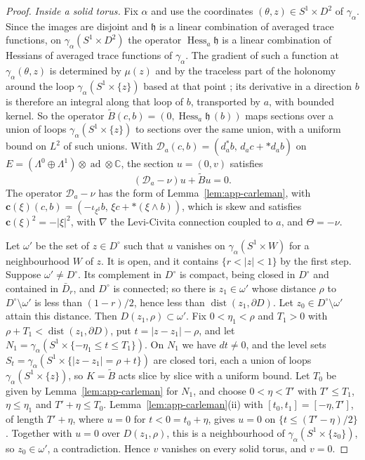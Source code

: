 \documentclass[11pt]{amsart}
\theoremstyle{definition}
\theoremstyle{remark}
\theoremstyle{plain}
\numberwithin{equation}{section}
\newcommand{\CC}{\mathbb{C}}
\newcommand{\ad}{\operatorname{ad}}
\newcommand{\dist}{\operatorname{dist}}
\begin{document}
\begin{proof}
\emph{Inside a solid torus.} Fix $\alpha$ and use the coordinates $(\theta,z)\in S^1\times D^2$ of
$\gamma_\alpha$. Since the images are disjoint and $\mathfrak h$ is a linear combination of averaged
trace functions, on $\gamma_\alpha(S^1\times D^2)$ the operator $\operatorname{Hess}_a\mathfrak h$ is a
linear combination of Hessians of averaged trace functions of $\gamma_\alpha$. The gradient of such
a function at $\gamma_\alpha(\theta,z)$ is determined by $\mu(z)$ and by the traceless part of the
holonomy around the loop $\gamma_\alpha(S^1\times\{z\})$ based at that point
\cite[Lemma~5.12]{Donaldson-book}; its derivative in a direction $b$ is therefore an integral
along that loop of $b$, transported by $a$, with bounded kernel. So the operator
$\widetilde B(c,b)=(0,\operatorname{Hess}_a\mathfrak h\,(b))$ maps sections over a union of loops
$\gamma_\alpha(S^1\times\{z\})$ to sections over the same union, with a uniform bound on $L^2$ of
such unions. With $\mathcal D_a(c,b)=(d_a^*b,\,d_ac+*d_ab)$ on
$E=(\Lambda^0\oplus\Lambda^1)\otimes\ad\otimes\CC$, the section $u=(0,v)$ satisfies
\[
(\mathcal D_a-\nu)u+\widetilde Bu=0 .
\]
The operator $\mathcal D_a-\nu$ has the form of Lemma~\ref{lem:app-carleman}, with
$\mathbf c(\xi)(c,b)=(-\iota_{\xi^\sharp}b,\,\xi c+*(\xi\wedge b))$, which is skew and satisfies
$\mathbf c(\xi)^2=-|\xi|^2$, with $\nabla$ the Levi-Civita connection coupled to $a$, and
$\Theta=-\nu$.

Let $\omega'$ be the set of $z\in D^\circ$ such that $u$ vanishes on $\gamma_\alpha(S^1\times W)$
for a neighbourhood $W$ of $z$. It is open, and it contains $\{r<|z|<1\}$ by the first step.
Suppose $\omega'\ne D^\circ$. Its complement in $D^\circ$ is compact, being closed in $D^\circ$ and
contained in $\bar D_r$, and $D^\circ$ is connected; so there is $z_1\in\omega'$ whose distance
$\rho$ to $D^\circ\setminus\omega'$ is less than $(1-r)/2$, hence less than
$\dist(z_1,\partial D)$. Let $z_0\in D^\circ\setminus\omega'$ attain this distance. Then
$D(z_1,\rho)\subset\omega'$. Fix $0<\eta_1<\rho$ and $T_1>0$ with
$\rho+T_1<\dist(z_1,\partial D)$, put $t=|z-z_1|-\rho$, and let
$N_1=\gamma_\alpha(S^1\times\{-\eta_1\le t\le T_1\})$. On $N_1$ we have $dt\ne0$, and the level
sets $S_t=\gamma_\alpha(S^1\times\{|z-z_1|=\rho+t\})$ are closed tori, each a union of loops
$\gamma_\alpha(S^1\times\{z\})$, so $K=\widetilde B$ acts slice by slice with a uniform bound.
Let $T_0$ be given by Lemma~\ref{lem:app-carleman} for $N_1$, and choose $0<\eta<T'$ with
$T'\le T_1$, $\eta\le\eta_1$ and $T'+\eta\le T_0$. Lemma~\ref{lem:app-carleman}(ii) with
$[t_0,t_1]=[-\eta,T']$, of length $T'+\eta$, where $u=0$ for $t<0=t_0+\eta$, gives $u=0$ on
$\{t\le(T'-\eta)/2\}$. Together with $u=0$ over $D(z_1,\rho)$, this is a neighbourhood of
$\gamma_\alpha(S^1\times\{z_0\})$, so $z_0\in\omega'$, a contradiction. Hence $v$ vanishes on every
solid torus, and $v=0$.
\end{proof}
\end{document}

